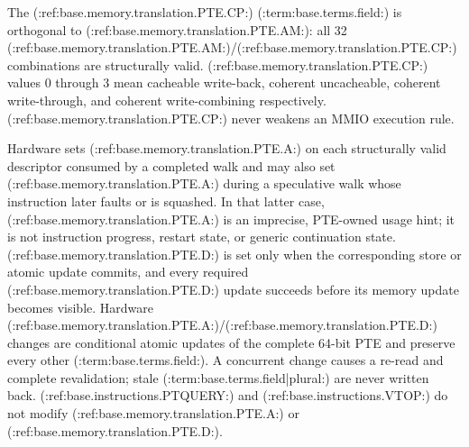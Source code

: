 The (:ref:base.memory.translation.PTE.CP:) (:term:base.terms.field:) is orthogonal to (:ref:base.memory.translation.PTE.AM:): all 32 (:ref:base.memory.translation.PTE.AM:)/(:ref:base.memory.translation.PTE.CP:) combinations are structurally
valid. (:ref:base.memory.translation.PTE.CP:) values 0 through 3 mean cacheable write-back, coherent uncacheable,
coherent write-through, and coherent write-combining respectively. (:ref:base.memory.translation.PTE.CP:) never
weakens an MMIO execution rule.

Hardware sets (:ref:base.memory.translation.PTE.A:) on each structurally valid descriptor consumed by a completed
walk and may also set (:ref:base.memory.translation.PTE.A:) during a speculative walk whose instruction later
faults or is squashed. In that latter case, (:ref:base.memory.translation.PTE.A:) is an imprecise, PTE-owned usage
hint; it is not instruction progress, restart state, or generic continuation state.
(:ref:base.memory.translation.PTE.D:) is set only when the corresponding store or atomic update
commits, and every required (:ref:base.memory.translation.PTE.D:) update succeeds before its memory update becomes
visible. Hardware (:ref:base.memory.translation.PTE.A:)/(:ref:base.memory.translation.PTE.D:) changes are conditional atomic updates of the complete
64-bit PTE and preserve every other (:term:base.terms.field:). A concurrent change causes a
re-read and complete revalidation; stale (:term:base.terms.field|plural:) are never written back.
(:ref:base.instructions.PTQUERY:) and (:ref:base.instructions.VTOP:) do not modify (:ref:base.memory.translation.PTE.A:) or (:ref:base.memory.translation.PTE.D:).

